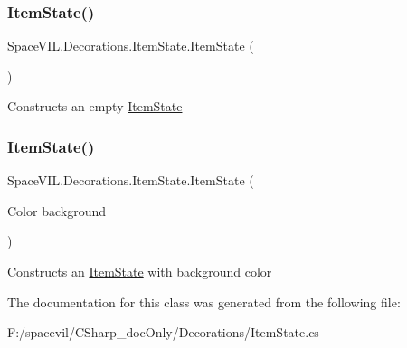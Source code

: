 \subsubsection{\texorpdfstring{Item\+State()}{ItemState()}\hspace{0.1cm}{\footnotesize\ttfamily [1/2]}}
{\footnotesize\ttfamily Space\+V\+I\+L.\+Decorations.\+Item\+State.\+Item\+State (\begin{DoxyParamCaption}{ }\end{DoxyParamCaption})}



Constructs an empty \mbox{\hyperlink{class_space_v_i_l_1_1_decorations_1_1_item_state}{Item\+State}} 

\mbox{\label{class_space_v_i_l_1_1_decorations_1_1_item_state_a9fc55f09c2eca01e8e465502683d8a1c}} 
\subsubsection{\texorpdfstring{Item\+State()}{ItemState()}\hspace{0.1cm}{\footnotesize\ttfamily [2/2]}}
{\footnotesize\ttfamily Space\+V\+I\+L.\+Decorations.\+Item\+State.\+Item\+State (\begin{DoxyParamCaption}\item[{Color}]{background }\end{DoxyParamCaption})}



Constructs an \mbox{\hyperlink{class_space_v_i_l_1_1_decorations_1_1_item_state}{Item\+State}} with background color 



The documentation for this class was generated from the following file\+:\begin{DoxyCompactItemize}
\item 
F\+:/spacevil/\+C\+Sharp\+\_\+doc\+Only/\+Decorations/Item\+State.\+cs\end{DoxyCompactItemize}
